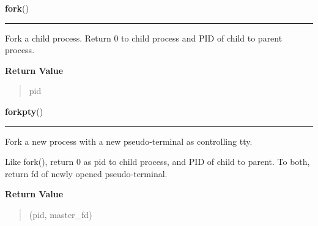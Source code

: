 \hspace{.8\funcindent}\begin{boxedminipage}{\funcwidth}

    \raggedright \textbf{fork}()

    \vspace{-1.5ex}

    \rule{\textwidth}{0.5\fboxrule}
\setlength{\parskip}{2ex}
    Fork a child process. Return 0 to child process and PID of child to 
    parent process.

\setlength{\parskip}{1ex}
      \textbf{Return Value}
    \vspace{-1ex}

      \begin{quote}
      pid

      \end{quote}

    \end{boxedminipage}

    \label{os:forkpty}

    \vspace{0.5ex}

\hspace{.8\funcindent}\begin{boxedminipage}{\funcwidth}

    \raggedright \textbf{forkpty}()

    \vspace{-1.5ex}

    \rule{\textwidth}{0.5\fboxrule}
\setlength{\parskip}{2ex}
    Fork a new process with a new pseudo-terminal as controlling tty.

    Like fork(), return 0 as pid to child process, and PID of child to 
    parent. To both, return fd of newly opened pseudo-terminal.

\setlength{\parskip}{1ex}
      \textbf{Return Value}
    \vspace{-1ex}

      \begin{quote}
      (pid, master\_fd)

      \end{quote}

    \end{boxedminipage}

    \label{os:fpathconf}

    \vspace{0.5ex}

